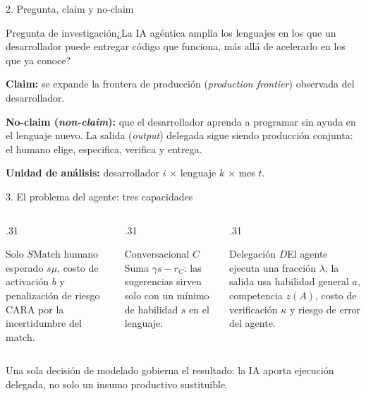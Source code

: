 \documentclass[aspectratio=169,10pt]{beamer}
\begin{document}
\begin{frame}{2. Pregunta, claim y no-claim}
\begin{block}{Pregunta de investigación}¿La IA agéntica amplía los lenguajes en los que un desarrollador puede entregar código que funciona, más allá de acelerarlo en los que ya conoce?\end{block}
\vspace{.5em}
\textbf{Claim:} se expande la \alert{frontera de producción} (\emph{production frontier}) observada del desarrollador.
\vspace{.5em}

\textbf{No-claim (\emph{non-claim}):} que el desarrollador aprenda a programar sin ayuda en el lenguaje nuevo. La salida (\emph{output}) delegada sigue siendo producción conjunta: el humano elige, especifica, verifica y entrega.
\vspace{.5em}

\textbf{Unidad de análisis:} desarrollador $i$ × lenguaje $k$ × mes $t$.
\end{frame}

\begin{frame}{3. El problema del agente: tres capacidades}
\begin{columns}[T,onlytextwidth]
\begin{column}{.31\textwidth}\begin{block}{Solo $S$}Match humano esperado $s\mu$, costo de activación $b$ y penalización de riesgo CARA por la incertidumbre del match.\end{block}\end{column}
\begin{column}{.31\textwidth}\begin{block}{Conversacional $C$}Suma $\gamma s-r_C$: las sugerencias sirven solo con un mínimo de habilidad $s$ en el lenguaje.\end{block}\end{column}
\begin{column}{.31\textwidth}\begin{block}{Delegación $D$}El agente ejecuta una fracción $\lambda$; la salida usa habilidad general $a$, competencia $z(A)$, costo de verificación $\kappa$ y riesgo de error del agente.\end{block}\end{column}
\end{columns}
\vspace{.8em}
\centering\large Una sola decisión de modelado gobierna el resultado: \alert{la IA aporta ejecución delegada, no solo un insumo productivo sustituible.}
\end{frame}
\end{document}
